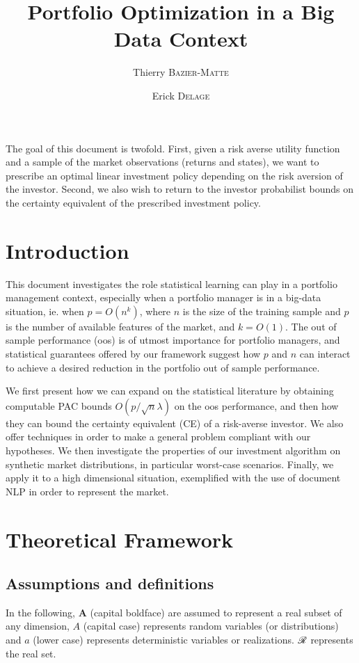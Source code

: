 \documentclass[11pt]{article}
\title{Portfolio Optimization in a Big Data Context}
\author{Thierry \textsc{Bazier-Matte} \and Erick \textsc{Delage}}
\begin{document}
\maketitle


The goal of this document is twofold. First, given a risk averse utility function and a
sample of the market observations (returns and states), we want to prescribe an optimal
linear investment policy depending on the risk aversion of the investor. Second, we also
wish to return to the investor probabilist bounds on the certainty equivalent of the
prescribed investment policy.

\section{Introduction}
\label{sec:intro}

This document investigates the role statistical learning can play in a portfolio
management context, especially when a portfolio manager is in a big-data situation,
ie. when $p=O(n^k)$, where $n$ is the size of the training sample and $p$ is the number of
available features of the market, and $k=O(1)$. The out of sample performance (oos) is of
utmost importance for portfolio managers, and statistical guarantees offered by our
framework suggest how $p$ and $n$ can interact to achieve a desired reduction in the
portfolio out of sample performance.

We first present how we can expand on the statistical literature by obtaining computable
PAC bounds $O(p/\sqrt{n}\lambda)$ on the oos performance, and then how they can bound the
certainty equivalent (CE) of a risk-averse investor. We also offer techniques in order to
make a general problem compliant with our hypotheses. We then investigate the properties
of our investment algorithm on synthetic market distributions, in particular worst-case
scenarios. Finally, we apply it to a high dimensional situation, exemplified with the use
of document NLP in order to represent the market.

\section{Theoretical Framework}

\subsection{Assumptions and definitions}


In the following, $\bm A$ (capital boldface) are assumed to represent a real subset of any
dimension, $A$ (capital case) represents random variables (or distributions) and $a$
(lower case) represents deterministic variables or realizations. $\mathscr{R}$ represents the
real set.
\end{document}
